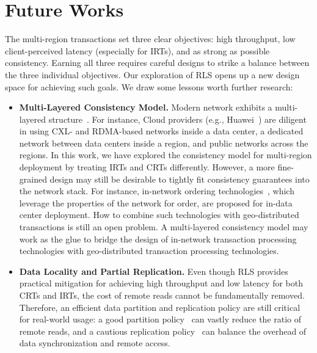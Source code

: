 \section{Future Works}
The multi-region transactions set three clear objectives: high throughput, low client-perceived latency (especially for IRTs), and as strong as possible consistency. Earning all three requires careful designs to strike a balance between the three individual objectives. Our exploration of RLS opens up a new design space for achieving such goals. We draw some lessons worth further research:

\begin{itemize}[leftmargin=*, itemsep=1pt]
\setlength{\parsep}{0pt}
\setlength{\parskip}{0pt}
\setlength{\parindent}{1em}
    \item \textbf{Multi-Layered Consistency Model.} Modern network exhibits a multi-layered structure~\cite{zhang2023redt, webb2011topology}. For instance, Cloud providers (e.g., Huawei~\cite{huawei:region}) are diligent in using CXL- and RDMA-based networks inside a data center, a dedicated network between data centers inside a region, and public networks across the regions. In this work, we have explored the consistency model for multi-region deployment by treating IRTs and CRTs differently. However, a more fine-grained design may still be desirable to tightly fit consistency guarantees into the network stack. For instance, in-network ordering technologies~\cite{bidl:sosp21, epaxos:sosp13, li20211pipe, choi2023hydra}, which leverage the properties of the network for order, are proposed for in-data center deployment. How to combine such technologies with geo-distributed transactions is still an open problem. A multi-layered consistency model may work as the glue to bridge the design of in-network transaction processing technologies with geo-distributed transaction processing technologies.
    \item \textbf{Data Locality and Partial Replication.} Even though RLS provides practical mitigation for achieving high throughput and low latency for both CRTs and IRTs, the cost of remote reads cannot be fundamentally removed. Therefore, an efficient data partition and replication policy are still critical for real-world usage: a good partition policy~\cite{abebe2020dynamast, abebe2020morphosys, curino2010schism, pavlo2012skew, zamanian2015locality} can vastly reduce the ratio of remote reads, and a cautious replication policy~\cite{taft2020cockroachdb, dast:eurosys21, schiper2010p} can balance the overhead of data synchronization and remote access. 
\end{itemize}